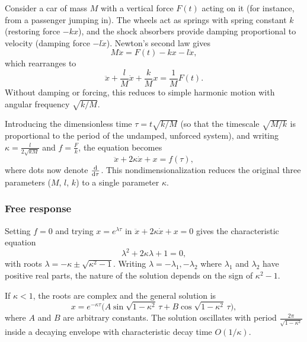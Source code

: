 \documentclass[a4paper]{article}
\begin{document}
\begin{eg}
  Consider a car of mass $M$ with a vertical force $F(t)$ acting on it (for instance, from a passenger jumping in). The wheels act as springs with spring constant $k$ (restoring force $-kx$), and the shock absorbers provide damping proportional to velocity (damping force $-l\dot{x}$). Newton's second law gives
  \[
    M\ddot x = F(t) - kx - l\dot x,
  \]
  which rearranges to
  \[
    \ddot x + \frac{l}{M}\dot x + \frac{k}{M}x = \frac{1}{M}F(t).
  \]
  Without damping or forcing, this reduces to simple harmonic motion with angular frequency $\sqrt{k/M}$.
\end{eg}

\begin{remark}[Nondimensionalization]
  Introducing the dimensionless time $\tau = t\sqrt{k/M}$ (so that the timescale $\sqrt{M/k}$ is proportional to the period of the undamped, unforced system), and writing $\kappa = \frac{l}{2\sqrt{kM}}$ and $f = \frac{F}{k}$, the equation becomes
  \[
    \ddot x + 2\kappa\dot x + x = f(\tau),
  \]
  where dots now denote $\frac{\mathrm{d}}{\mathrm{d}\tau}$. This nondimensionalization reduces the original three parameters ($M$, $l$, $k$) to a single parameter $\kappa$.
\end{remark}

\subsubsection{Free response}
\begin{prop}
  Setting $f = 0$ and trying $x = e^{\lambda\tau}$ in $\ddot x + 2\kappa\dot x + x = 0$ gives the characteristic equation
  \[
    \lambda^2 + 2\kappa\lambda + 1 = 0,
  \]
  with roots $\lambda = -\kappa \pm \sqrt{\kappa^2 - 1}$. Writing $\lambda = -\lambda_1, -\lambda_2$ where $\lambda_1$ and $\lambda_2$ have positive real parts, the nature of the solution depends on the sign of $\kappa^2 - 1$.
\end{prop}

\begin{prop}
  If $\kappa < 1$, the roots are complex and the general solution is
  \[
    x = e^{-\kappa\tau}\bigl(A\sin\sqrt{1 - \kappa^2}\,\tau + B\cos\sqrt{1 - \kappa^2}\,\tau\bigr),
  \]
  where $A$ and $B$ are arbitrary constants. The solution oscillates with period $\frac{2\pi}{\sqrt{1 - \kappa^2}}$ inside a decaying envelope with characteristic decay time $O(1/\kappa)$.
  \begin{center}
  \end{center}
\end{prop}
\end{document}
